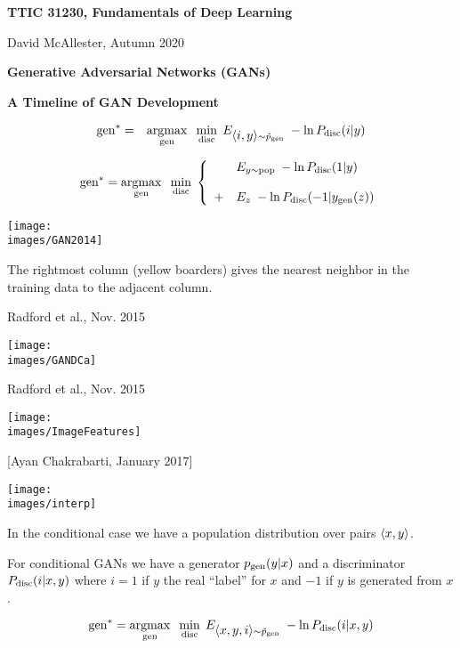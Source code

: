 





{\Huge

  \centerline{\bf TTIC 31230, Fundamentals of Deep Learning}
  \bigskip
  \centerline{David McAllester, Autumn 2020}
  \vfill
  \centerline{\bf Generative Adversarial Networks (GANs)}
  \vfill
  \centerline{\bf A Timeline of GAN Development}
\vfill
\vfill



\begin{eqnarray*}
\mathrm{gen}^* & = & \operatorname*{argmax}_{\mathrm{gen}}\;\;\min_{\mathrm{disc}}\;E_{{\mbox{$\langle i,y\rangle$}} \sim \tilde{p}_{\mathrm{gen}}}\;-\ln P_{\mathrm{disc}}(i|y)
\end{eqnarray*}

\vfill
$$\mathrm{gen}^* = \operatorname*{argmax}_{\mathrm{gen}}\;\;\min_{\mathrm{disc}}\;\left\{\begin{array}{ll} & E_{y \sim \mathrm{pop}}\;-\ln P_{\mathrm{disc}}(1|y) \\ \\ + &  E_z\;-\ln P_{\mathrm{disc}}(-1|y_{\mathrm{gen}}(z)) \end{array}\right.$$

\centerline{\texttt{[image: \\images/GAN2014]}}
The rightmost column (yellow boarders) gives the nearest neighbor in the training data to the adjacent column.

{Radford et al., Nov. 2015}

\centerline{\texttt{[image: \\images/GANDCa]}}

{Radford et al., Nov. 2015}

\centerline{\texttt{[image: \\images/ImageFeatures]}}


[Ayan Chakrabarti, January 2017]

\centerline{\texttt{[image: \\images/interp]}}

In the conditional case we have a population distribution over pairs ${\mbox{$\langle x,y\rangle$}}$.

\vfill
For conditional GANs we have a generator $p_{\mathrm{gen}}(y|x)$ and a discriminator $P_{\mathrm{disc}}(i|x,y)$
where $i = 1$ if $y$ the real ``label'' for $x$ and $-1$ if $y$ is generated from $x$.

{\color{red} $$\mathrm{gen}^* = \operatorname*{argmax}_{\mathrm{gen}}\;\;\min_{\mathrm{disc}}\;E_{{\mbox{$\langle x,y,i\rangle$}} \sim \tilde{p}_{\mathrm{gen}}}\;-\ln P_{\mathrm{disc}}(i|x,y)$$}

}
